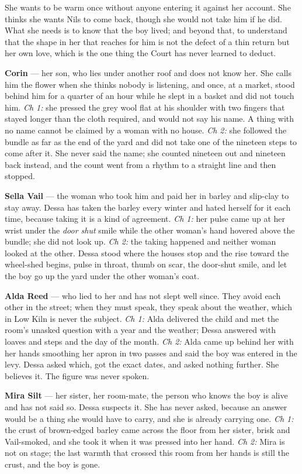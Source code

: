 \documentclass{design/chronicle}
\begin{document}
{
She wants to be warm once without anyone entering it against her account. She thinks she wants Nils to come back, though she would not take him if he did. What she needs is to know that the boy lived; and beyond that, to understand that the shape in her that reaches for him is not the defect of a thin return but her own love, which is the one thing the Court has never learned to deduct.

\textbf{Corin} — her son, who lies under another roof and does not know her. She calls him the flower when she thinks nobody is listening, and once, at a market, stood behind him for a quarter of an hour while he slept in a basket and did not touch him. \emph{Ch 1:} she pressed the grey wool flat at his shoulder with two fingers that stayed longer than the cloth required, and would not say his name. A thing with no name cannot be claimed by a woman with no house. \emph{Ch 2:} she followed the bundle as far as the end of the yard and did not take one of the nineteen steps to come after it. She never said the name; she counted nineteen out and nineteen back instead, and the count went from a rhythm to a straight line and then stopped.

\textbf{Sella Vail} — the woman who took him and paid her in barley and slip-clay to stay away. Dessa has taken the barley every winter and hated herself for it each time, because taking it is a kind of agreement. \emph{Ch 1:} her pulse came up at her wrist under the \emph{door shut} smile while the other woman’s hand hovered above the bundle; she did not look up. \emph{Ch 2:} the taking happened and neither woman looked at the other. Dessa stood where the houses stop and the rise toward the wheel-shed begins, pulse in throat, thumb on scar, the door-shut smile, and let the boy go up the yard under the other woman’s coat.

\textbf{Alda Reed} — who lied to her and has not slept well since. They avoid each other in the street; when they must speak, they speak about the weather, which in Low Kiln is never the subject. \emph{Ch 1:} Alda delivered the child and met the room’s unasked question with a year and the weather; Dessa answered with loaves and steps and the day of the month. \emph{Ch 2:} Alda came up behind her with her hands smoothing her apron in two passes and said the boy was entered in the levy. Dessa asked which, got the exact dates, and asked nothing further. She believes it. The figure was never spoken.

\textbf{Mira Silt} — her sister, her room-mate, the person who knows the boy is alive and has not said so. Dessa suspects it. She has never asked, because an answer would be a thing she would have to carry, and she is already carrying one. \emph{Ch 1:} the crust of brown-edged barley came across the floor from her sister, brisk and Vail-smoked, and she took it when it was pressed into her hand. \emph{Ch 2:} Mira is not on stage; the last warmth that crossed this room from her hands is still the crust, and the boy is gone.

}
\end{document}
